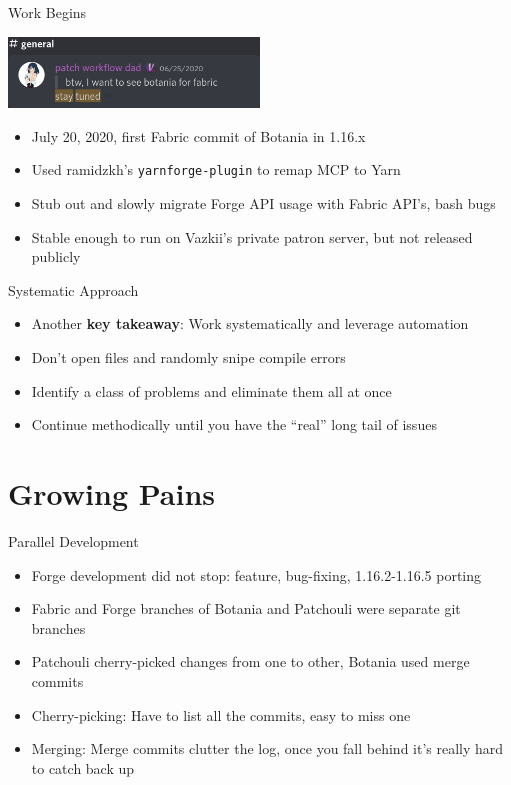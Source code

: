 \documentclass{beamer}
\begin{document}
\begin{frame}{Work Begins}
  \begin{center}
    \includegraphics[width=0.5\textwidth]{stay_tuned.png}
  \end{center}

  \begin{itemize}
  \item July 20, 2020, first Fabric commit of Botania in 1.16.x
  \item Used ramidzkh's \texttt{yarnforge-plugin} to remap MCP to Yarn
  \item Stub out and slowly migrate Forge API usage with Fabric API's, bash bugs
  \item Stable enough to run on Vazkii's private patron server, but not released publicly
  \end{itemize}
\end{frame}

\begin{frame}{Systematic Approach}
  \begin{itemize}
  \item Another \textbf{key takeaway}: Work systematically and leverage automation
  \item Don't open files and randomly snipe compile errors
  \item Identify a class of problems and eliminate them all at once
  \item Continue methodically until you have the ``real'' long tail of issues
  \end{itemize}
\end{frame}

\section{Growing Pains}
\begin{frame}{Parallel Development}
  \begin{itemize}
  \item Forge development did not stop: feature, bug-fixing, 1.16.2-1.16.5 porting
  \item Fabric and Forge branches of Botania and Patchouli were separate git branches
  \item Patchouli cherry-picked changes from one to other, Botania used merge commits
  \item Cherry-picking: Have to list all the commits, easy to miss one
  \item Merging: Merge commits clutter the log, once you fall behind it's really hard
    to catch back up
  \end{itemize}
\end{frame}
\end{document}
